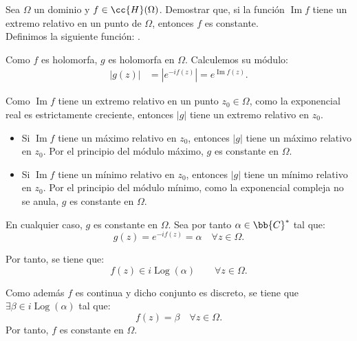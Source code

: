 \documentclass[12pt]{article}
\renewcommand{\Im}{\operatorname{Im}}
\DeclareMathOperator{\Log}{Log}
\begin{document}
    \begin{ejercicio}[2.5 puntos]
        Sea $\Omega$ un dominio y $f \in \cc{H}(\Omega)$. Demostrar que, si la función $\Im f$ tiene un extremo relativo en un punto de $\Omega$, entonces $f$ es constante.\\

        Definimos la siguiente función:
        .

        Como $f$ es holomorfa, $g$ es holomorfa en $\Omega$. Calculemos su módulo:
        \begin{align*}
            |g(z)| &= |e^{-if(z)}| = e^{\Im f(z)}.
        \end{align*}

        Como $\Im f$ tiene un extremo relativo en un punto $z_0\in \Omega$, como la exponencial real es estrictamente creciente, entonces $|g|$ tiene un extremo relativo en $z_0$.
        \begin{itemize}
            \item Si $\Im f$ tiene un máximo relativo en $z_0$, entonces $|g|$ tiene un máximo relativo en $z_0$. Por el principio del módulo máximo, $g$ es constante en $\Omega$.
            \item Si $\Im f$ tiene un mínimo relativo en $z_0$, entonces $|g|$ tiene un mínimo relativo en $z_0$. Por el principio del módulo mínimo, como la exponencial compleja no se anula, $g$ es constante en $\Omega$.
        \end{itemize}

        En cualquier caso, $g$ es constante en $\Omega$. Sea por tanto $\alpha\in \bb{C}^*$ tal que:
        \begin{equation*}
            g(z) = e^{-if(z)} = \alpha \quad \forall z\in \Omega.
        \end{equation*}

        Por tanto, se tiene que:
        \begin{equation*}
            f(z) \in i\Log(\alpha)\qquad \forall z\in \Omega.
        \end{equation*}

        Como además $f$ es continua y dicho conjunto es discreto, se tiene que $\exists \beta\in i\Log(\alpha)$ tal que:
        \begin{equation*}
            f(z) = \beta \quad \forall z\in \Omega.
        \end{equation*}
        Por tanto, $f$ es constante en $\Omega$.
    \end{ejercicio}
\end{document}
